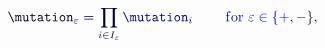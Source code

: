 \documentclass[12pt]{article}
\begin{document}
\makeatletter
\renewcommand*{\@textcolor}[3]{%
  \protect\leavevmode
  \begingroup
    \color#1{#2}#3%
  \endgroup
}
\makeatother
\begin{displaymath}
\mathcolor[RGB]{0,0,15}{\mutation} _ { \mathcolor[RGB]{0,0,30}{\varepsilon} } \mathcolor[RGB]{0,0,45}{=} \mathcolor[RGB]{0,0,60}{\prod} _ { \mathcolor[RGB]{0,0,75}{i} \mathcolor[RGB]{0,0,90}{\in} \mathcolor[RGB]{0,0,105}{I} _ { \mathcolor[RGB]{0,0,120}{\varepsilon} } } \mathcolor[RGB]{0,0,135}{\mutation} _ { \mathcolor[RGB]{0,0,150}{i} } \qquad \mathrm { ~ \mathcolor[RGB]{0,0,165}{f} \mathcolor[RGB]{0,0,180}{o} \mathcolor[RGB]{0,0,195}{r} ~ } \mathcolor[RGB]{0,0,210}{\varepsilon} \mathcolor[RGB]{0,0,225}{\in} \mathcolor[RGB]{0,0,240}{\{} \mathcolor[RGB]{0,0,255}{+} \mathcolor[RGB]{0,15,0}{,} \mathcolor[RGB]{0,15,15}{-} \mathcolor[RGB]{0,15,30}{\}} \mathcolor[RGB]{0,15,45}{,}
\end{displaymath}
\end{document}
